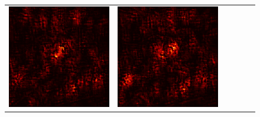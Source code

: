 \documentclass[preprint,12pt]{elsarticle}
\begin{document}
\begin{figure}[p]
\begin{tabular}{cccccc}
  \includegraphics[scale=\scale]{../visualizations/examples/imagenette/cnn/positive_saliency_map/0.png} & 
  \includegraphics[scale=\scale]{../visualizations/examples/imagenette/cnn/negative_saliency_map/0.png} & 

\end{tabular}
\end{figure}
\end{document}
